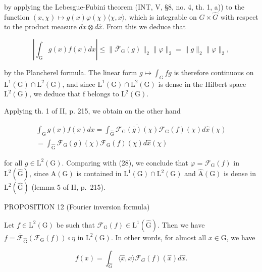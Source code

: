 by applying the Lebesgue-Fubini theorem (INT, V, §8, no. 4, th. 1, a)) to the function \((x,\chi)\mapsto g(x)\varphi(\chi)\langle\chi,x\rangle\), which is integrable on \(G\times\widehat{G}\) with respect to the product measure \(dx\otimes d\widehat{x}\). From this we deduce that

\[
\left| \int_ {\mathrm{G}} g (x) f (x) d x \right| \leqslant \| \overline {{{\mathcal {F}}}} _ {\mathrm{G}} (g) \| _ {2} \| \varphi \| _ {2} = \| g \| _ {2} \| \varphi \| _ {2},
\]

by the Plancherel formula. The linear form \(g \mapsto \int_{G} fg\) is therefore continuous on \(\mathrm{L}^{1}(\mathrm{G}) \cap \mathrm{L}^{2}(\mathrm{G})\), and since \(\mathrm{L}^{1}(\mathrm{G}) \cap \mathrm{L}^{2}(\mathrm{G})\) is dense in the Hilbert space \(\mathrm{L}^{2}(\mathrm{G})\), we deduce that f belongs to \(\mathrm{L}^{2}(\mathrm{G})\).

Applying th. 1 of II, p. 215, we obtain on the other hand

\[
\begin{array}{r} \int_ {\mathrm{G}} g (x) f (x) d x = \int_ {\widehat {\mathrm{G}}} \overline {{\mathcal {F} _ {\mathrm{G}} (\overline {{g}}) (\chi)}} \mathcal {F} _ {\mathrm{G}} (f) (\chi) d \widehat {x} (\chi) \\ = \int_ {\widehat {\mathrm{G}}} \overline {{\mathcal {F}}} _ {\mathrm{G}} (g) (\chi) \mathcal {F} _ {\mathrm{G}} (f) (\chi) d \widehat {x} (\chi) \end{array}
\]

for all \(g \in \mathrm{L}^{2}(\mathrm{G})\). Comparing with (28), we conclude that \(\varphi = \mathcal{F}_{\mathrm{G}}(f)\) in \(\mathrm{L}^{2}(\widehat{\mathrm{G}})\), since \(\mathrm{A}(\mathrm{G})\) is contained in \(\mathrm{L}^{1}(\mathrm{G}) \cap \mathrm{L}^{2}(\mathrm{G})\) and \(\widehat{\mathrm{A}}(\mathrm{G})\) is dense in \(\mathrm{L}^{2}(\widehat{\mathrm{G}})\) (lemma 5 of II, p.~215).

PROPOSITION 12 (Fourier inversion formula)

Let \(f \in \mathrm{L}^2(\mathrm{G})\) be such that \(\mathcal{F}_{\mathrm{G}}(f) \in \mathrm{L}^1(\widehat{\mathrm{G}})\). Then we have \(f = \overline{\mathcal{F}}_{\widehat{\mathrm{G}}}(\mathcal{F}_{\mathrm{G}}(f)) \circ \eta\) in \(\mathrm{L}^2(\mathrm{G})\). In other words, for almost all \(x \in \mathrm{G}\), we have

\[
f (x) = \int_ {\widehat {G}} \langle \widehat {x}, x \rangle \mathcal {F} _ {G} (f) (\widehat {x}) d \widehat {x}.
\]

